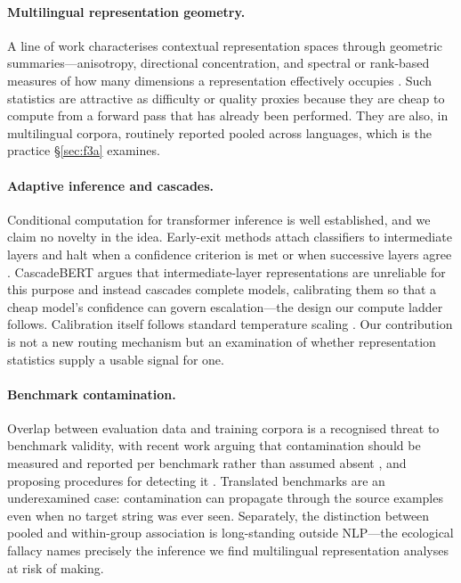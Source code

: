 \documentclass[11pt]{article}
\begin{document}
\paragraph{Multilingual representation geometry.} A line of work characterises
contextual representation spaces through geometric summaries---anisotropy,
directional concentration, and spectral or rank-based measures of how many
dimensions a representation effectively occupies
\citep{ethayarajh-2019-contextual}. Such statistics are attractive as difficulty or
quality proxies because they are cheap to compute from a forward pass that has
already been performed. They are also, in multilingual corpora, routinely
reported pooled across languages, which is the practice \S\ref{sec:f3a}
examines.

\paragraph{Adaptive inference and cascades.} Conditional computation for
transformer inference is well established, and we claim no novelty in the idea.
Early-exit methods attach classifiers to intermediate layers and halt when a
confidence criterion is met \citep{xin-etal-2020-deebert} or when successive layers
agree \citep{zhou2020pabee}. CascadeBERT \citep{li-etal-2021-cascadebert-accelerating} argues that
intermediate-layer representations are unreliable for this purpose and instead
cascades complete models, calibrating them so that a cheap model's confidence can
govern escalation---the design our compute ladder follows. Calibration itself
follows standard temperature scaling \citep{guo2017calibration}. Our contribution
is not a new routing mechanism but an examination of whether representation
statistics supply a usable signal for one.

\paragraph{Benchmark contamination.} Overlap between evaluation data and training
corpora is a recognised threat to benchmark validity, with recent work arguing
that contamination should be measured and reported per benchmark rather than
assumed absent \citep{sainz2023contamination}, and proposing procedures for
detecting it \citep{golchin2023quiz}. Translated benchmarks are an underexamined
case: contamination can propagate through the source examples even when no target
string was ever seen. Separately, the distinction between pooled and
within-group association is long-standing outside NLP---the ecological fallacy
\citep{robinson1950ecological} names precisely the inference we find multilingual
representation analyses at risk of making.
\end{document}
